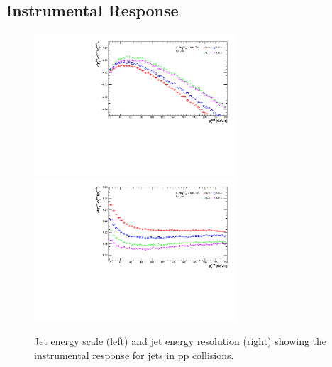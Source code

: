 \documentclass[ALICE]{ALICE_analysis_notes}
\newcommand{\pp}{pp\xspace}
\begin{document}
\subsection{Instrumental Response}
\label{sec:InstResponse}

\begin{figure}[h!]
    \centering
    \begin{multicols}{2}
            \includegraphics[width=7.5cm]{figures/EnergyScale/EnergyScaleMean.pdf}
        \vfill\null 
        \columnbreak
            \includegraphics[width=7.5cm]{figures/EnergyScale/EnergyScaleWidth.pdf}
        \vfill\null
    \end{multicols}
    \caption{Jet energy scale (left) and jet energy resolution (right) showing the instrumental response for jets in \pp collisions.}
    \label{fig:EnergyScale}
\end{figure}
\end{document}
